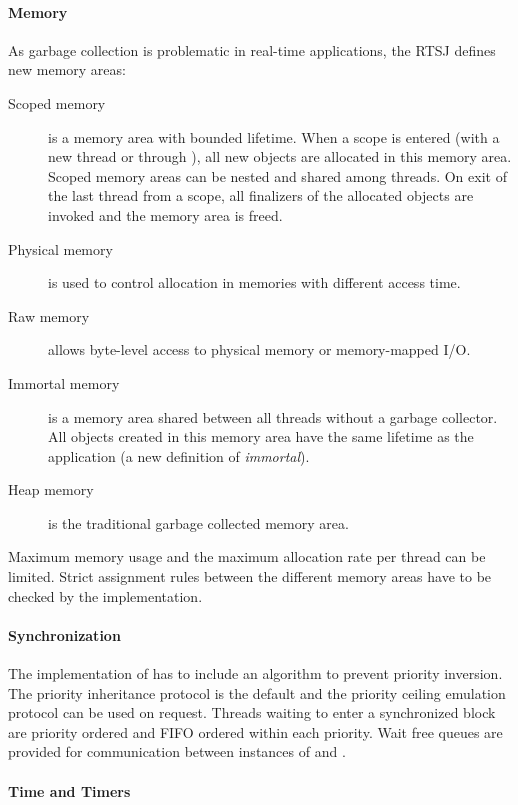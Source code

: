 \paragraph{Memory}

As garbage collection is problematic in real-time applications, the
RTSJ defines new memory areas:
%
\begin{description}
    \item[Scoped memory] is a memory area with bounded lifetime. When a scope is
entered (with a new thread or through ), all new
objects are allocated in this memory area. Scoped memory areas can
be nested and shared among threads. On exit of the last thread from
a scope, all finalizers of the allocated objects are invoked and the
memory area is freed.
    \item[Physical memory] is used to control allocation in memories with
different access time.
    \item[Raw memory] allows byte-level access to physical memory or memory-mapped I/O.
    \item[Immortal memory] is a memory area shared between
all threads without a garbage collector. All objects created in this
memory area have the same lifetime as the application (a new
definition of \textit{immortal}).
    \item[Heap memory] is the traditional garbage collected memory area.
\end{description}
%
Maximum memory usage and the maximum allocation rate per thread can
be limited. Strict assignment rules between the different memory
areas have to be checked by the implementation.

\paragraph{Synchronization}

The implementation of  has to include an
algorithm to prevent priority inversion. The priority inheritance
protocol is the default and the priority ceiling emulation protocol
can be used on request. Threads waiting to enter a synchronized
block are priority ordered and FIFO ordered within each priority.
Wait free queues are provided for communication between instances of
 and .

\paragraph{Time and Timers}

